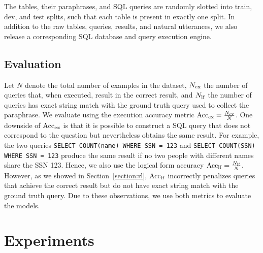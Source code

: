 \documentclass{article} %
\begin{document}
\label{section:execution_engine}
The tables, their paraphrases, and SQL queries are randomly slotted into train, dev, and test splits, such that each table is present in exactly one split. In addition to the raw tables, queries, results, and natural utterances, we also release a corresponding SQL database and query execution engine.


\subsection{Evaluation}
\label{section:evaluation}
\vspace{-2mm}

Let $N$ denote the total number of examples in the dataset,
$N_{\rm ex}$ the number of queries that, when executed, result in the correct result, and 
$N_{\rm lf}$ the number of queries has exact string match with the ground truth query used to collect the paraphrase.
We evaluate using the execution accuracy metric ${\rm Acc}_{\rm ex} = \frac{N_{\rm ex}}{N}$.
One downside of ${\rm Acc}_{\rm ex}$ is that it is possible to construct a SQL query that does not correspond to the question but nevertheless obtains the same result.
For example, the two queries \texttt{SELECT COUNT(name) WHERE SSN = 123} and \texttt{SELECT COUNT(SSN) WHERE SSN = 123} produce the same result if no two people with different names share the SSN 123.
Hence, we also use the logical form accuracy ${\rm Acc}_{\rm lf} = \frac{N_{\rm lf}}{N}$.
However, as we showed in Section~\ref{section:rl}, ${\rm Acc}_{\rm lf}$ incorrectly penalizes queries that achieve the correct result but do not have exact string match with the ground truth query.
Due to these observations, we use both metrics to evaluate the models.


\section{Experiments}
\vspace{-2mm}
\end{document}
